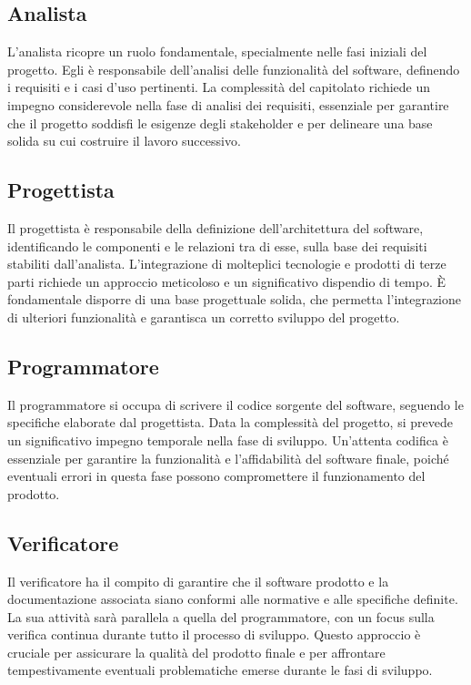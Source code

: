 \documentclass[a4paper, 12pt]{article}
\begin{document}
\subsection{Analista}
L’analista ricopre un ruolo fondamentale, specialmente nelle fasi iniziali del progetto. Egli è responsabile dell’analisi delle funzionalità del software, definendo i requisiti e i casi d’uso pertinenti. 
La complessità del capitolato richiede un impegno considerevole nella fase di analisi dei requisiti, essenziale per garantire che il progetto soddisfi le esigenze degli stakeholder e per delineare una base solida su cui costruire il lavoro successivo.

\subsection{Progettista}
Il progettista è responsabile della definizione dell'architettura del software, identificando le componenti e le relazioni tra di esse, sulla base dei requisiti stabiliti dall’analista. 
L'integrazione di molteplici tecnologie e prodotti di terze parti richiede un approccio meticoloso e un significativo dispendio di tempo. 
È fondamentale disporre di una base progettuale solida, che permetta l'integrazione di ulteriori funzionalità e garantisca un corretto sviluppo del progetto.

\subsection{Programmatore}
Il programmatore si occupa di scrivere il codice sorgente del software, seguendo le specifiche elaborate dal progettista. Data la complessità del progetto, si prevede un significativo impegno temporale nella fase di sviluppo. 
Un'attenta codifica è essenziale per garantire la funzionalità e l'affidabilità del software finale, poiché eventuali errori in questa fase possono compromettere il funzionamento del prodotto.

\subsection{Verificatore}
Il verificatore ha il compito di garantire che il software prodotto e la documentazione associata siano conformi alle normative e alle specifiche definite. 
La sua attività sarà parallela a quella del programmatore, con un focus sulla verifica continua durante tutto il processo di sviluppo. 
Questo approccio è cruciale per assicurare la qualità del prodotto finale e per affrontare tempestivamente eventuali problematiche emerse durante le fasi di sviluppo.
\end{document}
